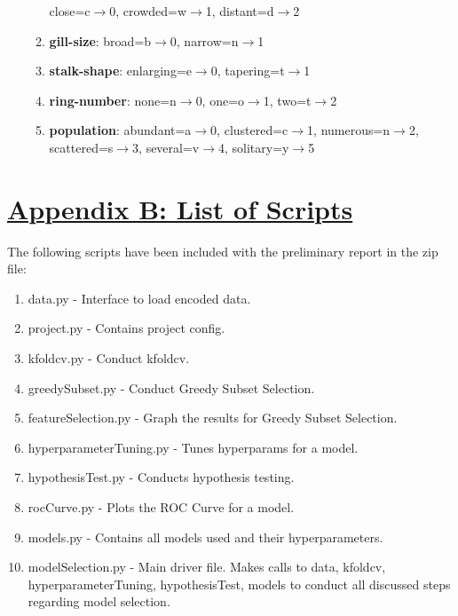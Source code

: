 \documentclass[fleqn]{article}
\begin{document}
\begin{enumerate}
\begin{enumerate}[label=\roman*.]
                close=c$\to$0,
                crowded=w$\to$1,
                distant=d$\to$2
            \item \textbf{gill-size}:
                broad=b$\to$0,
                narrow=n$\to$1
            \item \textbf{stalk-shape}:
                enlarging=e$\to$0,
                tapering=t$\to$1
            \item \textbf{ring-number}:
                none=n$\to$0,
                one=o$\to$1,
                two=t$\to$2
            \item \textbf{population}:
                abundant=a$\to$0,
                clustered=c$\to$1,
                numerous=n$\to$2,
                scattered=s$\to$3,
                several=v$\to$4,
                solitary=y$\to$5
        \end{enumerate}
    \end{enumerate}

    \newpage
    \section*{\underline{Appendix B: List of Scripts}}
    The following scripts have been included with the preliminary report in the zip file:
    \begin{enumerate}
        \item data.py - Interface to load encoded data.
        \item project.py - Contains project config.
        \item kfoldcv.py - Conduct kfoldcv.
        \item greedySubset.py - Conduct Greedy Subset Selection.
        \item featureSelection.py - Graph the results for Greedy Subset Selection.
        \item hyperparameterTuning.py - Tunes hyperparams for a model.
        \item hypothesisTest.py - Conducts hypothesis testing.
        \item rocCurve.py - Plots the ROC Curve for a model.
        \item models.py - Contains all models used and their hyperparameters.
        \item modelSelection.py - Main driver file. Makes calls to data, kfoldcv,
        hyperparameterTuning, hypothesisTest, models to conduct all discussed steps
        regarding model selection.
    \end{enumerate}
\end{document}
